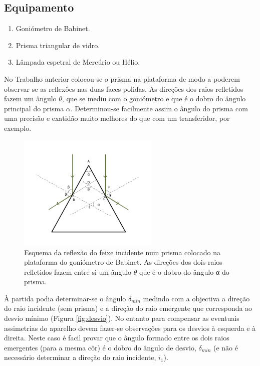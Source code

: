 \documentclass[a4paper,12pt]{article}  %
\begin{document}
\subsection{\sf Equipamento}

\begin{enumerate}
\item Goniómetro de Babinet.
\item Prisma triangular de vidro.
\item Lâmpada espetral de Mercúrio ou Hélio.
\end{enumerate}

No Trabalho anterior colocou-se o prisma na plataforma de modo a poderem observar-se as reflexões nas duas faces polidas. As direções dos raios refletidos fazem um ângulo $\theta$, que se mediu com o goniómetro e que é o dobro do ângulo principal do prisma $\alpha$.  Determinou-se facilmente assim o ângulo do prisma com uma precisão e exatidão muito melhores do que com um transferidor, por exemplo.

\begin{figure}[tb]  \centering 
	\includegraphics[width=0.6\textwidth]{angulo}
	\caption{Esquema da reflexão do feixe incidente num prisma colocado na plataforma do goniómetro de Babinet. As direções dos dois raios refletidos fazem entre si um ângulo $\theta$ que é o dobro do ângulo α do prisma. \label{fig:angulo}} 
\end{figure}

À partida podia determinar-se  o ângulo $\delta_{min}$ medindo com a objectiva a direção do raio incidente (sem prisma) e a direção do raio emergente que corresponda ao desvio mínimo (Figura \ref{fig:desvio}). No entanto para compensar as eventuais assimetrias do aparelho devem fazer-se observações para os desvios à esquerda e à direita.
Neste caso é facil provar que o ângulo formado entre os dois raios emergentes (para a mesma côr) é o dobro do ângulo de desvio, $\delta_{min}$ (e não é necessário determinar a direção do raio incidente, $i_1$).
\end{document}
